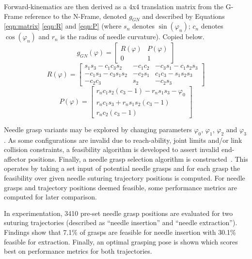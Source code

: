 \documentclass[english]{sobraep}
\begin{document}
\par{Forward-kinematics are then derived as a 4x4 translation matrix from the G-Frame reference to the N-Frame, denoted $g_{GN}$ and described by Equations \ref{eqn:matrix} \ref{eqn:R} and \ref{eqn:P} (where $s_n$ denotes $\sin(\varphi_n)$; $c_n$ denotes $\cos(\varphi_n)$ and $r_n$ is the radius of needle curvature). Copied below.}
\begin{equation}
    g_{GN}(\varphi) = 
      \begin{bmatrix}
      R(\varphi) & P(\varphi)\\
      0 & 1
      \end{bmatrix}
      \label{eqn:matrix}
\end{equation}
\begin{equation}
    R(\varphi) =  
    \begin{bmatrix}
    s_1 s_3 - c_1 c_3 s_2 & - c_1 c_2 & - c_3 s_1 - c_1 s_2 s_3 \\
    -c_1 s_3 - c_3 s_1 s_2 & - c_2 s_1 & c_1 c_3 - s_1 s_2 s_3 \\
    -c_2 c_3 & s_2 & -c_2 s_3
    \end{bmatrix}
    \label{eqn:R}
\end{equation}
\begin{equation}
    P(\varphi) = 
    \begin{bmatrix}
    r_n c_1 s_2 (c_3 - 1)-r_n s_1 s_3 - \varphi_0\\
    r_n c_1 s_3 + r_n s_1 s_2 (c_3 - 1)\\
    r_n c_2 (c_3 - 1)
    \end{bmatrix}
    \label{eqn:P}
\end{equation}

Needle grasp variants may be explored by changing parameters $\varphi_0$, $\varphi_1$, $\varphi_2$ and $\varphi_3$. As some configurations are invalid due to reach-ability, joint limits and/or link collision constraints, a feasibility algorithm is developed to assert invalid end-affector positions. Finally, a needle grasp selection algorithm is constructed~\cite[Algorithm 1]{needle-grasp}. This operates by taking a set input of potential needle grasps and for each grasp the feasibility over given needle suturing trajectory positions is computed. For needle grasps and trajectory positions deemed feasible, some performance metrics are computed for later comparison.

In experimentation, 3410 pre-set needle grasp positions are evaluated for two suturing trajectories (described as ``needle insertion'' and ``needle extraction''). Findings show that 7.1\% of grasps are feasible for needle insertion with 30.1\% feasible for extraction. Finally, an optimal grasping pose is shown which scores best on performance metrics for both trajectories. 
\end{document}
